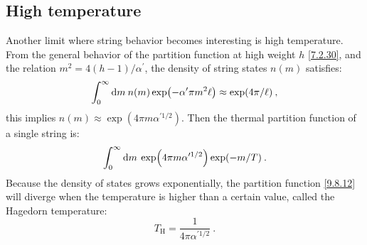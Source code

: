 \subsection*{High temperature}

Another limit where string behavior becomes interesting is high temperature.
From the general behavior of the partition function at high weight $h$ \eqref{7.2.30}, and the relation $m^{2}=4(h-1) / \alpha^{\prime}$, 
the density of string states $n(m)$ satisfies:
\begin{equation}
	\int_{0}^{\infty} \mathrm{d} m\: n(m) \exp (-\alpha^{\prime} \pi m^{2} \ell) \approx \exp (4 \pi / \ell) \:, \label{9.8.11}
\end{equation}
this implies $n(m) \approx \exp (4 \pi m \alpha^{\prime 1/2})$.
Then the thermal partition function of a single string is:
\begin{equation}
	\int_{0}^{\infty} \mathrm{d} m \: \exp (4 \pi m \alpha^{\prime 1/2}) \exp (-m / T) \:.
	\label{9.8.12}
\end{equation}
Because the density of states grows exponentially, the partition function \eqref{9.8.12} will diverge when the temperature is higher than a certain value, called the Hagedorn temperature:
\begin{equation}
	T_{\mathrm{H}}=\frac{1}{4 \pi \alpha^{\prime 1/2}} \:. \label{9.8.13}
\end{equation}
